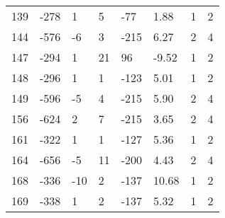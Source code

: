 \begin{appendices}
\begin{longtable}[c]{@{}llllllll@{}}
	139                      & -278                          & 1                            & 5                            & -77                      & 1.88                    & 1                    & 2                       \\
	144                      & -576                          & -6                           & 3                            & -215                     & 6.27                    & 2                    & 4                       \\
	147                      & -294                          & 1                            & 21                           & 96                       & -9.52                   & 1                    & 2                       \\
	148                      & -296                          & 1                            & 1                            & -123                     & 5.01                    & 1                    & 2                       \\
	149                      & -596                          & -5                           & 4                            & -215                     & 5.90                    & 2                    & 4                       \\
	156                      & -624                          & 2                            & 7                            & -215                     & 3.65                    & 2                    & 4                       \\
	161                      & -322                          & 1                            & 1                            & -127                     & 5.36                    & 1                    & 2                       \\
	164                      & -656                          & -5                           & 11                           & -200                     & 4.43                    & 2                    & 4                       \\
	168                      & -336                          & -10                          & 2                            & -137                     & 10.68                   & 1                    & 2                       \\
	169                      & -338                          & 1                            & 2                            & -137                     & 5.32                    & 1                    & 2                       \\

\end{longtable}
\end{appendices}
